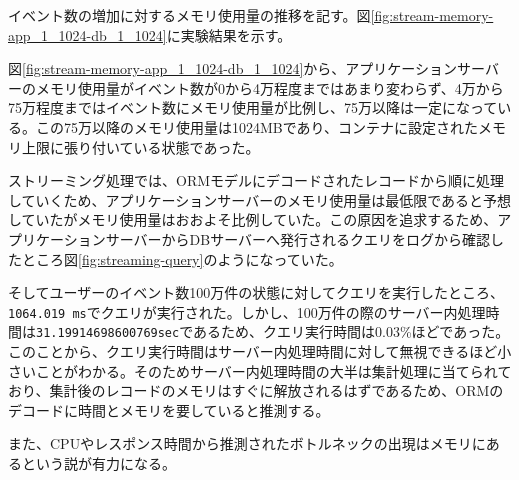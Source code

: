 \documentclass[../../../../../main]{subfiles}
\begin{document}
    \label{subsubsec:result-streaming-only-limit-memory}

    イベント数の増加に対するメモリ使用量の推移を記す。図\ref{fig:stream-memory-app_1_1024-db_1_1024}に実験結果を示す。

    

    図\ref{fig:stream-memory-app_1_1024-db_1_1024}から、アプリケーションサーバーのメモリ使用量がイベント数が0から4万程度まではあまり変わらず、4万から75万程度まではイベント数にメモリ使用量が比例し、75万以降は一定になっている。この75万以降のメモリ使用量は1024MBであり、コンテナに設定されたメモリ上限に張り付いている状態であった。

    ストリーミング処理では、ORMモデルにデコードされたレコードから順に処理していくため、アプリケーションサーバーのメモリ使用量は最低限であると予想していたがメモリ使用量はおおよそ比例していた。この原因を追求するため、アプリケーションサーバーからDBサーバーへ発行されるクエリをログから確認したところ図\ref{fig:streaming-query}のようになっていた。

    
    
    そしてユーザーのイベント数100万件の状態に対してクエリを実行したところ、\texttt{1064.019 ms}でクエリが実行された。しかし、100万件の際のサーバー内処理時間は\texttt{31.19914698600769sec}であるため、クエリ実行時間は0.03\%ほどであった。このことから、クエリ実行時間はサーバー内処理時間に対して無視できるほど小さいことがわかる。そのためサーバー内処理時間の大半は集計処理に当てられており、集計後のレコードのメモリはすぐに解放されるはずであるため、ORMのデコードに時間とメモリを要していると推測する。

    また、CPUやレスポンス時間から推測されたボトルネックの出現はメモリにあるという説が有力になる。
\end{document}
